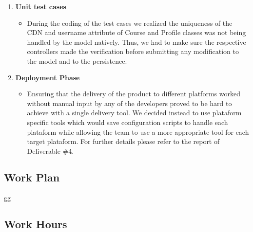 \documentclass[12pt]{article}
\begin{document}
 \begin{enumerate}
     \item \textbf{Unit test cases}
     \begin{itemize}
     	\item During the coding of the test cases we realized the uniqueness of the CDN and username attribute of Course and Profile classes was not being handled by the model natively. Thus, we had to make sure the respective controllers made the verification before submitting any modification to the model and to the persistence.
     \end{itemize}
     \item \textbf{Deployment Phase}
     \begin{itemize}
     	\item Ensuring that the delivery of the product to different platforms worked without manual input by any of the developers proved to be hard to achieve with a single delivery tool. We decided instead to use plataform specific tools which would save configuration scripts to handle each plataform while allowing the team to use a more appropriate tool for each target plataform. For further details please refer to the report of Deliverable \#4. 
     \end{itemize}
 \end{enumerate}

 \subsection{Work Plan}

 gg

 \subsection{Work Hours}
\end{document}
